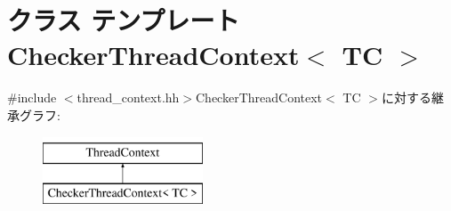 \hypertarget{classCheckerThreadContext}{
\section{クラス テンプレート CheckerThreadContext$<$ TC $>$}
\label{classCheckerThreadContext}
}


{\ttfamily \#include $<$thread\_\-context.hh$>$}CheckerThreadContext$<$ TC $>$に対する継承グラフ:\begin{figure}[H]
\begin{center}
\leavevmode
\includegraphics[height=2cm]{classCheckerThreadContext}
\end{center}
\end{figure}
